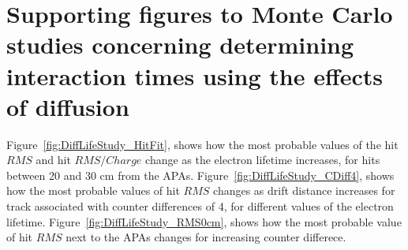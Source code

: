 \chapter{Supporting figures to Monte Carlo studies concerning determining interaction times using the effects of diffusion} 

\graphicspath{{Appendix1/Figs/PDF/}{Appendix1/Figs/Raster/}{Appendix1/Figs/Vector/}}

Figure~\ref{fig:DiffLifeStudy_HitFit}, shows how the most probable values of the hit $RMS$ and hit $RMS/Charge$ change as the electron lifetime increases, for hits between 20 and 30 cm from the APAs. Figure~\ref{fig:DiffLifeStudy_CDiff4}, shows how the most probable values of hit $RMS$ changes as drift distance increases for track associated with counter differences of 4, for different values of the electron lifetime. Figure~\ref{fig:DiffLifeStudy_RMS0cm}, shows how the most probable value of hit $RMS$ next to the APAs changes for increasing counter differece. \\ 

